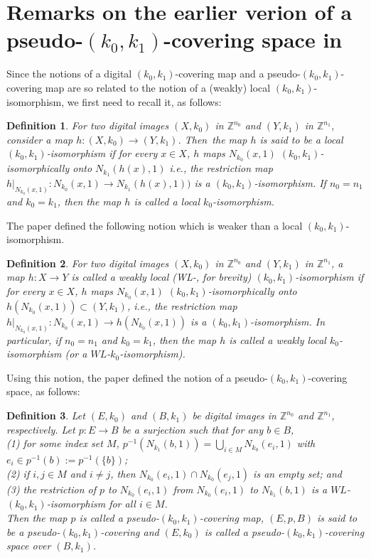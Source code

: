\documentclass[J,12pt]{amsart}
\newtheorem{definition}{Definition}
\begin{document}
\section{\bf Remarks on the earlier verion of a pseudo-$(k_0,k_1)$-covering space in \cite{H6,H9}}\label{s3}

Since the notions of a digital $(k_0,k_1)$-covering map and a pseudo-$(k_0,k_1)$-covering map are so related to the notion of a (weakly) local  $(k_0,k_1)$-isomorphism, we first need to recall it, as follows: 

\begin{definition} \cite{H1,H3,H9}
	For two digital images $(X, k_0)$ in ${\mathbb Z}^{n_0}$ and $(Y, k_1)$ in ${\mathbb Z}^{n_1}$, consider a  map  $h: (X,k_0) \to  (Y,k_1)$. Then~the map $h$ is said to be a local $(k_0, k_1)$-isomorphism
	if  for every $x \in X$, $h$ maps $N_{k_0}(x, 1)$ $(k_0, k_1)$-isomorphically onto $N_{k_1}(h(x), 1)$ i.e., the restriction map $h\vert_{N_{k_0}(x, 1)}:
	N_{k_0}(x, 1) \to N_{k_1}(h(x), 1))$ is a $(k_0, k_1)$-isomorphism.
	If $n_0 = n_1$ and $k_0 = k_1 $, then the map $h$ is called a local $k_0$-isomorphism.
\end{definition}

The paper \cite{H6} defined the following notion which is weaker than a local  $(k_0, k_1)$-isomorphism.

\begin{definition} \cite{H6} For two digital images $(X, k_0)$ in ${\mathbb Z}^{n_0}$ and
	$(Y, k_1)$ in ${\mathbb Z}^{n_1}$, a map $h: X \to Y$ is called a
	weakly local (WL-, for brevity) $(k_0, k_1)$-isomorphism
	if  for every $x \in X$, $h$ maps $N_{k_0}(x, 1)$ $(k_0, k_1)$-isomorphically onto $h(N_{k_0}(x, 1))\subset (Y, k_1)$, i.e., the restriction map $h\vert_{N_{k_0}(x, 1)}:
	N_{k_0}(x, 1) \to h(N_{k_0}(x, 1))$ is a $(k_0, k_1)$-isomorphism.
	In particular, if $n_0 = n_1$ and $k_0 = k_1 $, then the map $h$ is called a weakly local $k_0$-isomorphism (or a $WL$-$k_0$-isomorphism).
\end{definition}

Using this notion, the paper \cite{H6} defined  the notion of a pseudo-$(k_0, k_1)$-covering space, as follows:
\begin{definition} \cite{H6}
	Let $(E, k_0)$ and $(B, k_1)$ be digital images in  ${\mathbb Z}^{n_0}$  and  ${\mathbb Z}^{n_1}$, respectively.
	Let $p: E \to B $ be a surjection such that for any $b \in B$,\\
	(1) for some index set $M$, $p^{-1}(N_{k_1}(b, 1)) = \bigcup\limits_{i \in M}N_{k_0}(e_i, 1)$ with $e_i \in p^{-1}(b):=p^{-1}(\{b\})$;\\
	(2) if  $i, j \in M$ and $i \neq j$, then
	$N_{k_0}(e_i, 1)\cap N_{k_0}(e_j, 1)$ is an empty set; and\\
	(3) the restriction of $p$ to $N_{k_0}(e_i, 1)$ from $N_{k_0}(e_i, 1)$ to $N_{k_1}(b, 1)$ is a $WL$-$(k_0, k_1)$-isomorphism for all $i \in M$.\\
	Then the map $p$ is called a pseudo-$(k_0, k_1)$-covering map, $(E, p,
	B)$ is said to be a pseudo-$(k_0, k_1)$-covering and $(E, k_0)$ is called a pseudo-$(k_0, k_1)$-covering space over $(B, k_1)$.
\end{definition}
\end{document}
